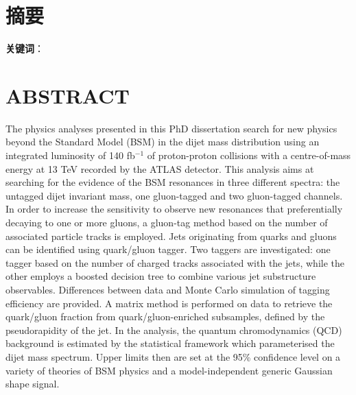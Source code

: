 \documentclass[UTF8,12pt]{ctexart}
\numberwithin{equation}{section}
\renewcommand{\rm}{\mathrm}
\def\ifb{fb$^{-1}$ }
\begin{document}
		\newpage
		\pagestyle{fancy}
		\fancyhf{}
		\cfoot{$\bm{-\,\rm{\thepage}\,-}$}
		
		
		
		\section*{摘\quad 要}
		
		
		
		
		\textbf{关键词}：
		\\
		
		
		


\newpage


\section*{\textbf{ABSTRACT}}

\hspace{8mm}

The physics analyses presented in this PhD dissertation search for new physics beyond the Standard Model (BSM) in the dijet mass distribution using an integrated luminosity of 140 \ifb of proton-proton collisions with a centre-of-mass energy at 13 TeV recorded by the ATLAS detector. This analysis aims at searching for the evidence of the BSM resonances in three different spectra: the untagged dijet invariant mass, one gluon-tagged and two gluon-tagged channels. In order to increase the sensitivity to observe new resonances that preferentially decaying to one or more gluons, a gluon-tag method based on the number of associated particle tracks is employed. Jets originating from quarks and gluons can be identified using quark/gluon tagger. Two taggers are investigated: one tagger based on the number of charged tracks associated with the jets, while the other employs a boosted decision tree to combine various jet substructure observables. Differences between data and Monte Carlo simulation of tagging efficiency are provided. A matrix method is performed on data to retrieve the quark/gluon fraction from quark/gluon-enriched subsamples, defined by the pseudorapidity of the jet. In the analysis, the quantum chromodynamics (QCD) background is estimated by the statistical framework which parameterised the dijet mass spectrum. Upper limits then are set at the 95\% confidence level on a variety of theories of BSM physics and a model-independent generic Gaussian shape signal.
\end{document}
